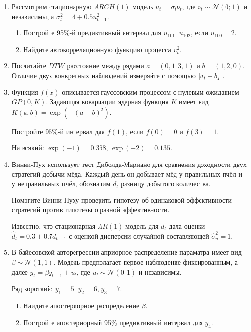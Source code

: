 \documentclass[12pt]{article}
\def \cN{\mathcal{N}}
\begin{document}
\begin{enumerate}

\item Рассмотрим стационарную $ARCH(1)$ модель $u_t = \sigma_t \nu_t$, где $\nu_t\sim \cN(0;1)$ и независимы,
а $\sigma_t^2= 4 + 0.5 u_{t-1}^2$.

\begin{enumerate}
	\item Постройте 95\%-й предиктивный интервал для $u_{101}$, $u_{102}$, если $u_{100} = 2$.
	\item Найдите автокорреляционную функцию процесса $u_t^2$.
\end{enumerate}


\item Посчитайте $DTW$ расстояние между рядами $a=(0, 1, 3, 1)$ и $b = (1,2,0)$. 
Отличие двух конкретных наблюдений измеряйте с помощью $\abs{a_i - b_j}$.

\item Функция $f(x)$ описывается гауссовским процессом с нулевым ожиданием $GP(0, K)$.
Задающая ковариации ядерная функция $K$ имеет вид $K(a, b) = \exp(-(a-b)^2)$. 

Постройте 95\%-й интервал для $f(1)$, если $f(0)=0$ и $f(3)=1$.

На всякий: $\exp(-1)= 0.368$, $\exp(-2)=0.135$.

\item Винни-Пух использует тест Диболда-Мариано для сравнения доходности двух стратегий добычи мёда. 
Каждый день он добывает мёд у правильных пчёл и у неправильных пчёл, обозначим $d_t$ разницу добытого количества. 

Помогите Винни-Пуху проверить гипотезу об одинаковой эффективности стратегий против гипотезы о разной эффективности. 

Известно, что стационарная $AR(1)$ модель для $d_t$ дала оценки $\hat d_t = 0.3 + 0.7 d_{t-1}$ 
с оценкой дисперсии случайной составляющей $\hat\sigma^2_u = 1$.


\item В байесовской авторегрессии априорное распределение параматра имеет вид $\beta \sim \cN(1,1)$.
Модель предполагает первое наблюдение фиксированным, а далее $y_t = \beta y_{t-1} + u_t$, где $u_t \sim \cN(0;1)$ и независимы.

Ряд короткий: $y_1 = 5$, $y_2 = 6$, $y_3 = 7$.

\begin{enumerate}
	\item Найдите апостериорное распределение $\beta$.
	\item Постройте апостериорный 95\% предиктивный интервал для $y_4$.
\end{enumerate}


\end{enumerate}
\end{document}

